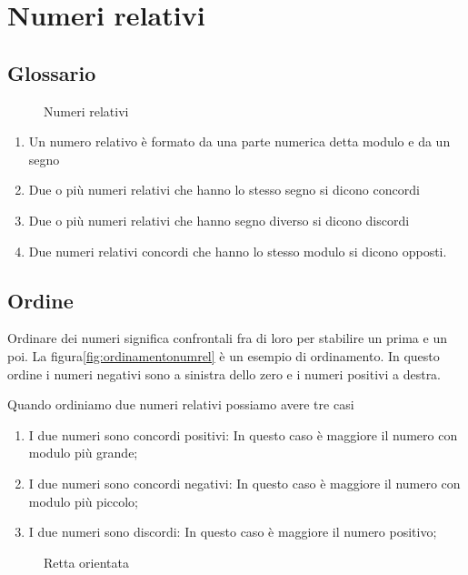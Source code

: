 \chapter{Numeri relativi}
\label{sha:numerirelativi}
\section{Glossario}
\begin{figure} 
	\centering

	\caption{Numeri relativi}
	\label{fig:numORealativi}
\end{figure}
\begin{enumerate}
	\item Un numero relativo è formato da una parte numerica detta modulo e da un segno
	\item Due o più numeri relativi che hanno lo stesso segno si dicono concordi
	\item Due o più numeri relativi che hanno  segno diverso si dicono discordi
	\item Due numeri relativi concordi che hanno lo stesso modulo si dicono opposti.
\end{enumerate}
\section{Ordine}
Ordinare dei numeri significa confrontali fra di loro per stabilire un prima e un poi. La figura\nobs\vref{fig:ordinamentonumrel} è un esempio di ordinamento. In questo ordine i numeri negativi sono a sinistra dello zero e i numeri positivi a destra. 

Quando ordiniamo due numeri relativi possiamo avere tre casi
\begin{enumerate}
	\item I due numeri sono concordi positivi: In questo caso è maggiore il numero con modulo più grande;
	\item I due numeri sono concordi negativi: In questo caso è maggiore il numero con modulo più piccolo;
	\item  I due numeri sono discordi: In questo caso è maggiore il numero positivo;
\end{enumerate}
\begin{figure} 
	\centering

	\caption{Retta orientata}
	\label{fig:ordinamentonumrel}\end{figure}
